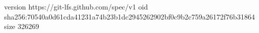version https://git-lfs.github.com/spec/v1
oid sha256:70540a0d61cda41231a74b23b1dc2945262902bf0c9b2c759a26172f76b31864
size 326269
